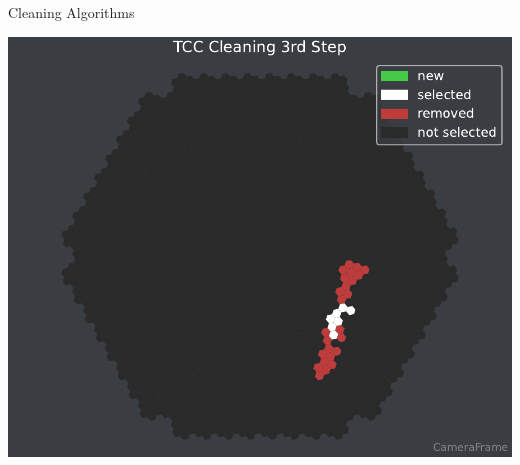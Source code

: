 \begin{frame}[t]{Cleaning Algorithms}
{\begin{overlayarea}{0.36\textwidth}{3.5cm}
{        \includegraphics[width=\textwidth]{plots/cleaner_steps/dark/tcc_3.pdf}
      }
\end{overlayarea}}
\end{frame}
